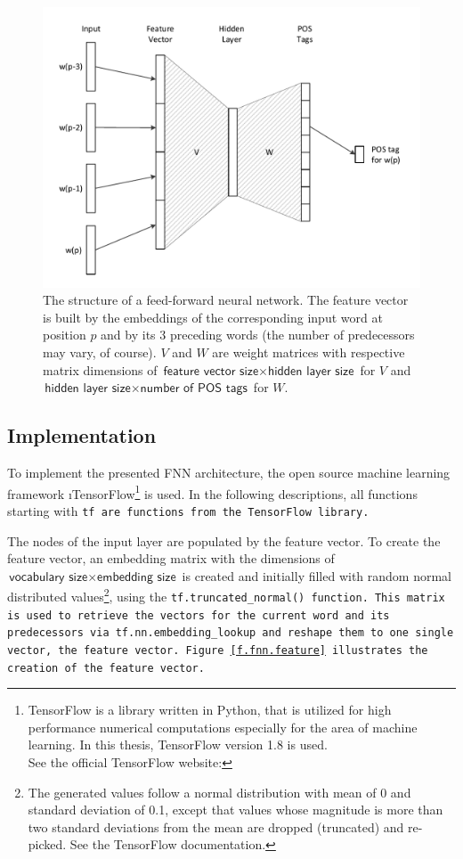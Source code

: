 \begin{figure}[ht]
	\includegraphics[width=\textwidth]{images/fnn_structure}
	\caption[Structure of a Feed-forward Neural Network]{The structure of a feed-forward neural network. The feature vector is built by the embeddings of the corresponding input word at position $p$ and by its 3 preceding words (the number of predecessors may vary, of course). $V$ and $W$ are weight matrices with respective matrix dimensions of $\textsf{feature vector size} \times \textsf{hidden layer size}$ for $V$ and $\textsf{hidden layer size} \times \textsf{number of POS tags}$ for $W$.}
	\label{f.fnn.structure}
\end{figure}

\subsection{Implementation}\label{c.postagging.fnn.implementation}
To implement the presented FNN architecture, the open source machine learning framework \i{TensorFlow}\footnote{TensorFlow is a library written in Python, that is utilized for high performance numerical computations especially for the area of machine learning. In this thesis, TensorFlow version 1.8 is used.\\See the official TensorFlow website: } is used. In the following descriptions, all functions starting with \tt{tf} are functions from the TensorFlow library.

The nodes of the input layer are populated by the feature vector. To create the feature vector, an embedding matrix with the dimensions of $\textsf{vocabulary size} \times \textsf{embedding size}$ is created and initially filled with random normal distributed values\footnote{The generated values follow a normal distribution with mean of 0 and standard deviation of 0.1, except that values whose magnitude is more than two standard deviations from the mean are dropped (truncated) and re-picked. See the TensorFlow documentation.}, using the \tt{tf.truncated\_normal()} function. This matrix is used to retrieve the vectors for the current word and its predecessors via \tt{tf.nn.embedding\_lookup} and reshape them to one single vector, the feature vector. Figure \ref{f.fnn.feature} illustrates the creation of the feature vector.

